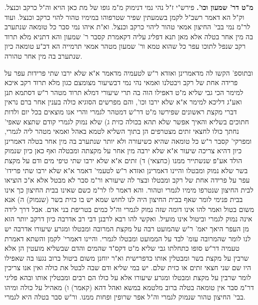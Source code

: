 \documentclass[12pt, openany]{book}
\newcommand{\sethebfont}{
\fontsize{10.5pt}{21.0pt} \selectfont
}
\newcommand{\twocol}[1]{
	{\sethebfont \begin{multicols}{2}
			#1
	\end{multicols}}	
}
\begin{document}
\twocol{\textbf{מ"ט דר' שמעון וכו'.}  פירש"י ז"ל נהי נמי דנימוק מ"מ גופו של מת כאן הויא וה"ל כרקב וכנצל. וק"ל הא דאמר רשב"ל לקמן בשמעתין שפיר שטרפוהו במימיו טהור להוי כרקב וכנצל. ועוד לר"מ נמי בבי' החיצון אמאי טהור ליהוי כרקב וכנצל. וא"ת איהו נמי סבר כל טומאה שנתערב בה מין אחר בטלה אלא מאן תנא דפליג עליה דקאמרת קסבר ר' שמעון והא דתניא מלא תרוד רקב שנפל לתוכו עפר כל שהוא טמא ור' שמעון מטהר אמאי תרמייה הא דכ"ע טומאה כיון שנתערב בה מין אחר טהורה.\par  ובתוספ' הקשו לה מדאמרינן ואזדא ר"ש לטעמיה מדאמר א"א שלא ירבו שתי פרידות עפר על פרידה אחת של רקב ויבטלנו ואמאי נהי נמי דבשיעור מצומצם כגון מלא תרוד רקב איכא למימר הכי גבי שליא מ"ט דאפילו הוה בה תרי שיעורי דמלא תרוד מטהר ר"ש דסתמא תנן ואע"ג דליכא למימר א"א שלא ירבו וכו', והם מפרשים הסוגיא כולה בענין אחר ברם נראין דברי מקצת ראשונים שפירשו מ"ט דר"ש דמטהר לגמרי והרי אנו מוצאים בכל יום ולדות חתוכים בשליא והאיך אפשר שלא תהא בכולה כזית ג) שלא נמוק לגמרי קודם שתצא שאפי' נחתך כולו לחצאי זתים מצטרפים הן בתוך השליא לטמא באהל ואמאי מטהר ליה לגמרי, ומפרקי' קסבר ר"ש כל טומאה שהיא כשיעורה ולא יותר שנתערב בה מין אחר בטלה דאמרינן כיון דהיא צריכה שיעור א"א שלא ירבה מין אחר על מקצתה ומבטלה ואף כאן כיון שנמוק הולד אע"פ שנשתייר ממנו (כחצאי) ד) זתים א"א שלא ירבו שתי טיפי מים ודם על מקצת בשר שלא נמוק ומבטלו והיינו דאמרינן ואזדא ר"ש לטעמי' דאמר א"א שלא ירבו שתי פרידו' עפר על פרידה אחת של רקב ומבטלו ובצר לה שיעורא ור"מ סבר לא מבטל אלא א"כ הוציאו לבית החיצון שנטרפו מימיו לגמרי וטהור. והא דאמר לו לר"מ כשם שאינו בבית החיצון כך אינו בבית פנימי לומר שאף בבית החיצון היה לנו לחוש שמא יש בו כזית בשר (שנמוק) ה) אנא משום בטול ואמר להו אינו דומה שזה נמוק לגמרי וה"ל כמים בטריפת בני אדם. אבל דרך לידה אינה נמוק לגמרי וביטול אינו מועיל. ואקשי להו רבא לרבנן דבי רב אדרבה כיון דרקב יותר הוא מן העפר היאך יאמ' ר"ש שהמועט רבה על מקצת המרובה ומבטלו ומגרע שיעורו אדרבה יש לנו לומר שהמרובה עומ' לבד על הממועט ומבטלו לגמרי. והיינו דאמרי' לקמן והשתא דאמרת טעמיה דר"ש סופו כתחלתו גבי שליא מ"ט דקס"ד שהמים והדם שבשליא מועטין הן אלא שרבין על מקצת בשר ומבטלין אותו כדפרישית וא"ר יוחנן משום ביטול ברוב נגעו בה שאפילו היו שם שני חצאי זתים או כזית שלם. יש במי שליא ודם שבה לבטל את כולה ואין אנו צריכין לומר שרבין על מקצת ומבטלו ומגרע שיעורו אלא על כולו הם רבים ומבטלין אותו ובהא פליגי דר"מ סבר אין טומאה בטלה ברוב מלטמא במשא ואהל דהא (קאמר) ו) מאהיל על כולה ומיהו בבי' החיצון טהור שנמוק לגמרי וה"ל אפר שרופין ופחות ממנו. ור"ש סבר בטלה היא לגמרי. 
\par}
\end{document}
